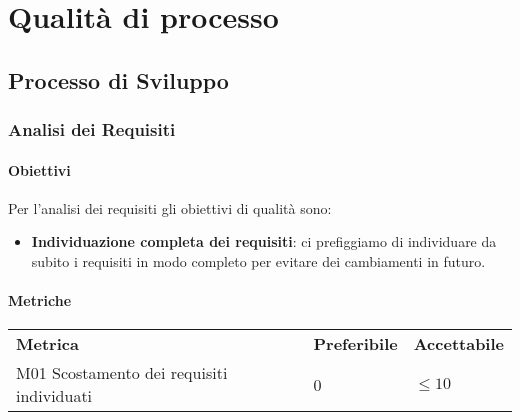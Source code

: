 \section{Qualità di processo}
	\subsection{Processo di Sviluppo}
		\subsubsection{Analisi dei Requisiti} 
			\paragraph{Obiettivi}
			Per l'analisi dei requisiti gli obiettivi di qualità sono:
			\begin{itemize}
				\item \textbf{Individuazione completa dei requisiti}: ci prefiggiamo di individuare da subito i requisiti in modo completo per evitare dei cambiamenti in futuro.
			\end{itemize}
			\paragraph{Metriche} \mbox{}
			\begin{longtable} {
					>{}p{80mm} 
					>{}p{25mm}
					>{}p{25mm}
				}
				\rowcolor{gray!50}
				\textbf{Metrica} & \textbf{Preferibile} & \textbf{Accettabile} \TBstrut \TBstrut \\
				M01 Scostamento dei requisiti individuati & 0 & $\le 10$ \TBstrut \\ [2mm]
			\end{longtable}
			
